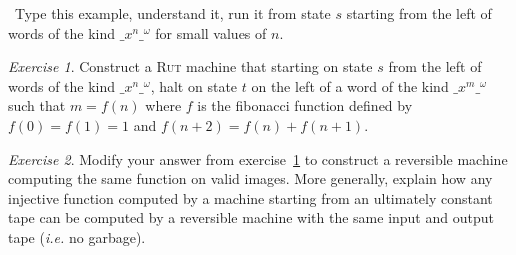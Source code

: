 \documentclass[a4paper,11pt]{article}
\theoremstyle{remark}
\newtheorem{exercise}{Exercise}
\newcommand\doit[1]{\medskip\par\noindent\ding{229}~\textsf{#1}}
\begin{document}
\doit{Type this example, understand it, run it from state $s$ starting from the left of words of
the kind $\_x^n{\_}^\omega$ for small values of $n$.}

\begin{exercise}\label{ex:fib}
Construct a \textsc{Rut} machine that starting on state $s$ from the left of words of the kind
$\_x^n{\_}^\omega$, halt on state $t$ on the left of a word of the kind  $\_x^m{\_}^\omega$
such that $m=f(n)$ where $f$ is the fibonacci function defined
by $f(0)=f(1)=1$ and $f(n+2)=f(n)+f(n+1)$.
\end{exercise}

\begin{exercise}
Modify your answer from exercise~\ref{ex:fib} to construct a reversible machine
computing the same function on valid images. More generally, explain how any injective function
computed by a machine starting from an ultimately constant tape 
can be computed by a reversible machine with the same input and output tape (\emph{i.e.} no garbage).
\end{exercise}
\end{document}
